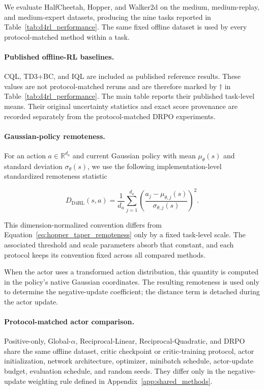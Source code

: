 \documentclass{article}
\theoremstyle{plain}
\theoremstyle{definition}
\theoremstyle{remark}
\begin{document}
We evaluate HalfCheetah, Hopper, and Walker2d on the medium,
medium-replay, and medium-expert datasets, producing the nine tasks
reported in Table~\ref{tab:d4rl_performance}. The same fixed offline
dataset is used by every protocol-matched method within a task.

\paragraph{Published offline-RL baselines.}

CQL, TD3+BC, and IQL are included as published reference results.
These values are not protocol-matched reruns and are therefore marked
by \(\dagger\) in Table~\ref{tab:d4rl_performance}. The main table
reports their published task-level means. Their original uncertainty
statistics and exact score provenance are recorded separately from the
protocol-matched DRPO experiments.

\paragraph{Gaussian-policy remoteness.}

For an action \(a\in\mathbb{R}^{d_a}\) and current Gaussian policy with
mean \(\mu_\theta(s)\) and standard deviation \(\sigma_\theta(s)\), we use the
following implementation-level standardized remoteness statistic

\[
D_{\mathrm{D4RL}}(s,a)
=
\frac{1}{d_a}
\sum_{j=1}^{d_a}
\left(
\frac{a_j-\mu_{\theta,j}(s)}
     {\sigma_{\theta,j}(s)}
\right)^2.
\]

This dimension-normalized convention differs from
Equation~\eqref{eq:hopper_taper_remoteness} only by a fixed task-level scale.
The associated threshold and scale parameters absorb that constant, and each
protocol keeps its convention fixed across all compared methods.

When the actor uses a transformed action distribution, this quantity is
computed in the policy's native Gaussian coordinates. The resulting
remoteness is used only to determine the negative-update coefficient;
the distance term is detached during the actor update.

\paragraph{Protocol-matched actor comparison.}

Positive-only, Global-\(\alpha\), Reciprocal-Linear,
Reciprocal-Quadratic, and DRPO share the same offline dataset, critic
checkpoint or critic-training protocol, actor initialization, network
architecture, optimizer, minibatch schedule, actor-update budget,
evaluation schedule, and random seeds. They differ only in the
negative-update weighting rule defined in
Appendix~\ref{app:shared_methods}.
\end{document}
